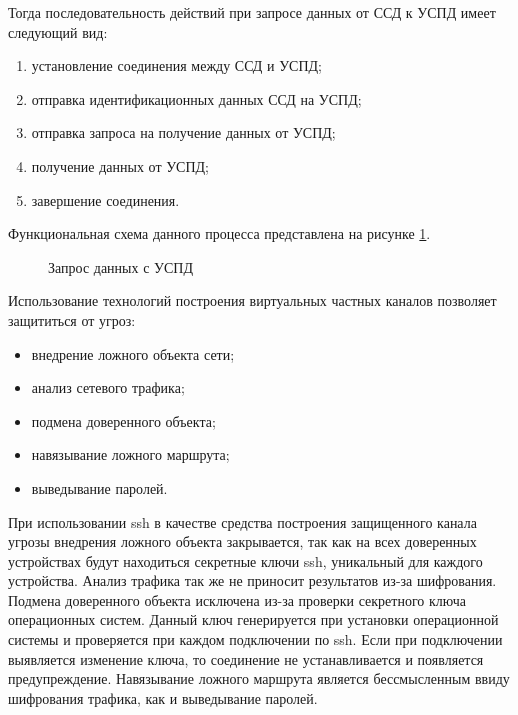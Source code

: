 Тогда последовательность действий при запросе данных от ССД к УСПД имеет следующий вид:

\begin{enumerate}
 \item установление соединения между ССД и УСПД;
 \item отправка идентификационных данных ССД на УСПД;
 \item отправка запроса на получение данных от УСПД;
 \item получение данных от УСПД;
 \item завершение соединения.
\end{enumerate}

Функциональная схема данного процесса представлена на рисунке \ref{img:get_data_idef0}.

\begin{figure}[!ht]
 \caption{Запрос данных с УСПД}
 \label{img:get_data_idef0}
\end{figure}

Использование технологий построения виртуальных частных каналов позволяет защититься от угроз:

\begin{itemize}
 \item внедрение ложного объекта сети;
 \item анализ сетевого трафика;
 \item подмена доверенного объекта;
 \item навязывание ложного маршрута;
 \item выведывание паролей.
\end{itemize}

При использовании ssh в качестве средства построения защищенного канала угрозы внедрения ложного объекта закрывается, так как на всех доверенных устройствах будут находиться секретные ключи ssh, уникальный для каждого устройства. Анализ трафика так же не приносит результатов из-за шифрования. Подмена доверенного объекта исключена из-за проверки секретного ключа операционных систем. Данный ключ генерируется при установки операционной системы и проверяется при каждом подключении по ssh. Если при подключении выявляется изменение ключа, то соединение не устанавливается и появляется предупреждение. Навязывание ложного маршрута является бессмысленным ввиду шифрования трафика, как и выведывание паролей.